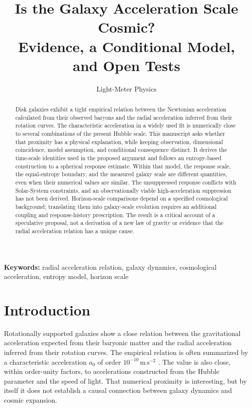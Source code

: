 \documentclass[12pt]{article}
\title{Is the Galaxy Acceleration Scale Cosmic?\\
Evidence, a Conditional Model, and Open Tests}
\author{Light-Meter Physics}
\date{}
\begin{document}
\maketitle

\begin{abstract}
Disk galaxies exhibit a tight empirical relation between the Newtonian acceleration calculated from their observed baryons and the radial acceleration inferred from their rotation curves. The characteristic acceleration in a widely used fit is numerically close to several combinations of the present Hubble scale. This manuscript asks whether that proximity has a physical explanation, while keeping observation, dimensional coincidence, model assumption, and conditional consequence distinct. It derives the time-scale identities used in the proposed argument and follows an entropy-based construction to a spherical response estimate. Within that model, the response scale, the equal-entropy boundary, and the measured galaxy scale are different quantities, even when their numerical values are similar. The unsuppressed response conflicts with Solar-System constraints, and an observationally viable high-acceleration suppression has not been derived. Horizon-scale comparisons depend on a specified cosmological background; translating them into galaxy-scale evolution requires an additional coupling and response-history prescription. The result is a critical account of a speculative proposal, not a derivation of a new law of gravity or evidence that the radial acceleration relation has a unique cause.
\end{abstract}

\noindent\textbf{Keywords:} radial acceleration relation, galaxy dynamics, cosmological acceleration, entropy model, horizon scale

\section{Introduction}
\label{sec:introduction}

Rotationally supported galaxies show a close relation between the gravitational acceleration expected from their baryonic matter and the radial acceleration inferred from their rotation curves. The empirical relation is often summarized by a characteristic acceleration $a_0$ of order $10^{-10}\,\mathrm{m\,s^{-2}}$ \cite{McGaughRAR}. The value is also close, within order-unity factors, to accelerations constructed from the Hubble parameter and the speed of light. That numerical proximity is interesting, but by itself it does not establish a causal connection between galaxy dynamics and cosmic expansion.
\end{document}
